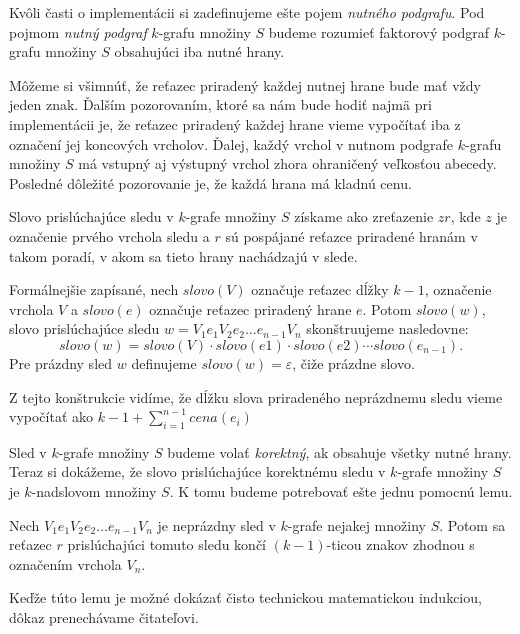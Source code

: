 Kvôli časti o implementácii si zadefinujeme ešte pojem \emph{nutného podgrafu}.
Pod pojmom \emph{nutný podgraf} $k$-grafu množiny $S$ budeme rozumieť faktorový
podgraf $k$-grafu množiny $S$ obsahujúci iba nutné hrany.

Môžeme si všimnúť, že reťazec priradený každej nutnej hrane bude mať vždy jeden
znak. Ďalším pozorovaním,
ktoré sa nám bude hodiť najmä pri implementácii je, že reťazec priradený každej
hrane vieme vypočítať iba z označení jej koncových vrcholov. Ďalej, každý vrchol
v nutnom podgrafe $k$-grafu množiny $S$ má vstupný aj výstupný vrchol zhora
ohraničený veľkosťou abecedy. Posledné dôležité
pozorovanie je, že každá hrana má kladnú cenu.

Slovo prislúchajúce sledu v $k$-grafe množiny $S$ získame ako zreťazenie $zr$, kde $z$ je
označenie prvého vrchola sledu a $r$ sú pospájané reťazce priradené hranám v takom
poradí, v akom sa tieto hrany nachádzajú v slede.

Formálnejšie zapísané, nech $slovo(V)$ označuje reťazec dĺžky $k-1$, označenie vrchola
$V$ a $slovo(e)$ označuje reťazec priradený hrane $e$. Potom $slovo(w)$, slovo
prislúchajúce sledu $w = V_1 e_1 V_2 e_2 \ldots e_{n-1} V_n$ skonštruujeme nasledovne: 
$$slovo(w) = slovo(V) \cdot slovo(e1) \cdot slovo(e2) \cdots slovo(e_{n-1}).$$
Pre prázdny sled $w$ definujeme $slovo(w) = \varepsilon$, čiže prázdne slovo.

Z tejto konštrukcie vidíme, že dĺžku slova priradeného neprázdnemu sledu vieme
vypočítať ako $k-1 + \sum \limits_{i=1}^{n-1} cena(e_i)$

Sled v $k$-grafe množiny $S$ budeme volať \emph{korektný}, ak obsahuje všetky nutné hrany.
Teraz si dokážeme, že slovo prislúchajúce korektnému sledu v $k$-grafe množiny $S$ je
$k$-nadslovom množiny $S$. K tomu budeme potrebovať ešte jednu pomocnú lemu.

\begin{lema}
\label{vertex_end_lemma}
    Nech $V_1 e_1 V_2 e_2 \ldots e_{n-1} V_n$ je neprázdny sled v $k$-grafe nejakej množiny $S$.
    Potom sa reťazec $r$ prislúchajúci tomuto sledu končí $(k-1)$-ticou znakov zhodnou
    s označením vrchola $V_n$.
\end{lema}

Keďže túto lemu je možné dokázať čisto technickou matematickou indukciou, dôkaz prenechávame
čitateľovi.

